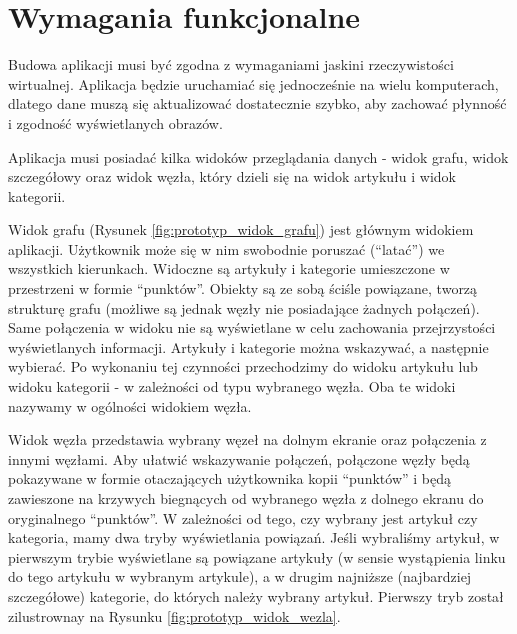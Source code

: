\section{Wymagania funkcjonalne}
Budowa aplikacji musi być zgodna z wymaganiami jaskini rzeczywistości wirtualnej. Aplikacja będzie uruchamiać się jednocześnie na wielu komputerach, dlatego dane muszą się aktualizować dostatecznie szybko, aby zachować płynność i zgodność wyświetlanych obrazów.

Aplikacja musi posiadać kilka widoków przeglądania danych - widok grafu, widok szczegółowy oraz widok węzła, który dzieli się na widok artykułu i widok kategorii.

Widok grafu (Rysunek \ref{fig:prototyp_widok_grafu}) jest głównym widokiem aplikacji. Użytkownik może się w nim swobodnie poruszać (``latać'') we wszystkich kierunkach. Widoczne są artykuły i kategorie umieszczone w przestrzeni w formie ``punktów''. Obiekty są ze sobą ściśle powiązane, tworzą strukturę grafu (możliwe są jednak węzły nie posiadające żadnych połączeń). Same połączenia w widoku nie są wyświetlane w celu zachowania przejrzystości wyświetlanych informacji. Artykuły i kategorie można wskazywać, a następnie wybierać. Po wykonaniu tej czynności przechodzimy do widoku artykułu lub widoku kategorii - w zależności od typu wybranego węzła. Oba te widoki nazywamy w ogólności widokiem węzła.


Widok węzła przedstawia wybrany węzeł na dolnym ekranie oraz połączenia z innymi węzłami. Aby ułatwić wskazywanie połączeń, połączone węzły będą pokazywane w formie otaczających użytkownika kopii ``punktów'' i będą zawieszone na krzywych biegnących od wybranego węzła z dolnego ekranu do oryginalnego ``punktów''. W zależności od tego, czy wybrany jest artykuł czy kategoria, mamy dwa tryby wyświetlania powiązań. Jeśli wybraliśmy artykuł, w pierwszym trybie wyświetlane są powiązane artykuły (w sensie wystąpienia linku do tego artykułu w wybranym artykule), a w drugim najniższe (najbardziej szczegółowe) kategorie, do których należy wybrany artykuł. Pierwszy tryb został zilustrownay na Rysunku \ref{fig:prototyp_widok_wezla}.


